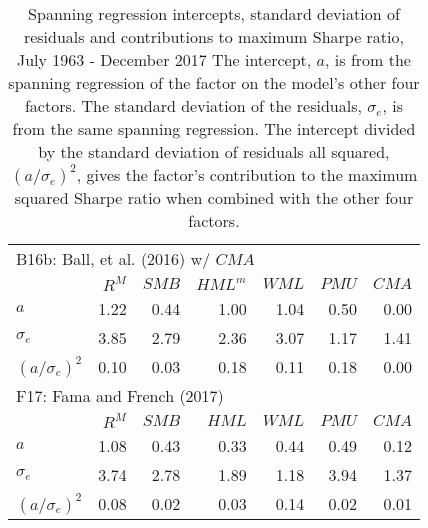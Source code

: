 
\begin{table}[!ht]
\label{tbl:contributions}
\centering
\caption{
\scriptsize{
Spanning regression intercepts, standard deviation of residuals and contributions to
maximum Sharpe ratio, July 1963 - December 2017 The intercept, $a$, is from the spanning
regression of the factor on the model’s other four factors. The standard deviation of the
residuals, $\sigma_e$, is from the same spanning regression. The intercept divided by the
standard deviation of residuals all squared, $\left( a/\sigma_e\right) ^2$, gives the
factor's contribution to the maximum squared Sharpe ratio when combined with the other
four factors.
}
}
\begin{tabular}{lrrrrrr}
  \toprule
  \multicolumn{7}{l}{B16b: Ball, et al. (2016) w/ $CMA$}  \\
                                &  $R^M$ &  $SMB$ &$HML^m$ &  $WML$ &  $PMU$ &  $CMA$ \\
  $a$                           &  1.22  &  0.44  &  1.00  &  1.04  &  0.50  &  0.00  \\
  $\sigma_e$                    &  3.85  &  2.79  &  2.36  &  3.07  &  1.17  &  1.41  \\
  $\left( a/\sigma_e\right) ^2$ &  0.10  &  0.03  &  0.18  &  0.11  &  0.18  &  0.00  \\
[1em]
  \multicolumn{7}{l}{F17: Fama and French (2017)}  \\
                                &  $R^M$ &  $SMB$ &  $HML$ &  $WML$ &  $PMU$ &  $CMA$ \\
  $a$                           &  1.08  &  0.43  &  0.33  &  0.44  &  0.49  &  0.12  \\
  $\sigma_e$                    &  3.74  &  2.78  &  1.89  &  1.18  &  3.94  &  1.37  \\
  $\left( a/\sigma_e\right) ^2$ &  0.08  &  0.02  &  0.03  &  0.14  &  0.02  &  0.01  \\
  \bottomrule
\end{tabular}
\end{table}
